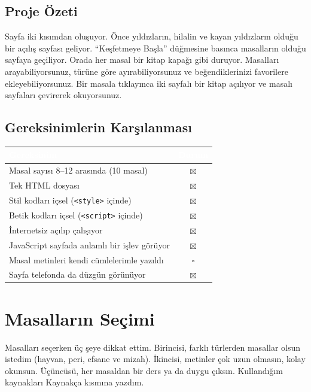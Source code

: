 \documentclass[12pt,a4paper]{article}
\begin{document}
\subsection{Proje Özeti}
Sayfa iki kısımdan oluşuyor. Önce yıldızların, hilalin ve kayan yıldızların olduğu bir açılış sayfası geliyor. ``Keşfetmeye Başla'' düğmesine basınca masalların olduğu sayfaya geçiliyor. Orada her masal bir kitap kapağı gibi duruyor. Masalları arayabiliyorsunuz, türüne göre ayırabiliyorsunuz ve beğendiklerinizi favorilere ekleyebiliyorsunuz. Bir masala tıklayınca iki sayfalı bir kitap açılıyor ve masalı sayfaları çevirerek okuyorsunuz.

\subsection{Gereksinimlerin Karşılanması}
\begin{center}
\begin{tabular}{@{}p{8.2cm}c@{}}
\toprule
\rowcolor{ana}\textcolor{white}{\textbf{Gereksinim}} & \textcolor{white}{\textbf{Durum}} \\
\midrule
Masal sayısı 8--12 arasında (10 masal)                 & $\boxtimes$ \\
Tek HTML dosyası                                    & $\boxtimes$ \\
Stil kodları içsel (\texttt{<style>} içinde)        & $\boxtimes$ \\
Betik kodları içsel (\texttt{<script>} içinde)      & $\boxtimes$ \\
İnternetsiz açılıp çalışıyor                        & $\boxtimes$ \\
JavaScript sayfada anlamlı bir işlev görüyor        & $\boxtimes$ \\
Masal metinleri kendi cümlelerimle yazıldı          & $\square$ \\
Sayfa telefonda da düzgün görünüyor                 & $\boxtimes$ \\
\bottomrule
\end{tabular}
\end{center}

\section{Masalların Seçimi}
Masalları seçerken üç şeye dikkat ettim. Birincisi, farklı türlerden masallar olsun istedim (hayvan, peri, efsane ve mizah). İkincisi, metinler çok uzun olmasın, kolay okunsun. Üçüncüsü, her masaldan bir ders ya da duygu çıksın. Kullandığım kaynakları Kaynakça kısmına yazdım.
\end{document}
